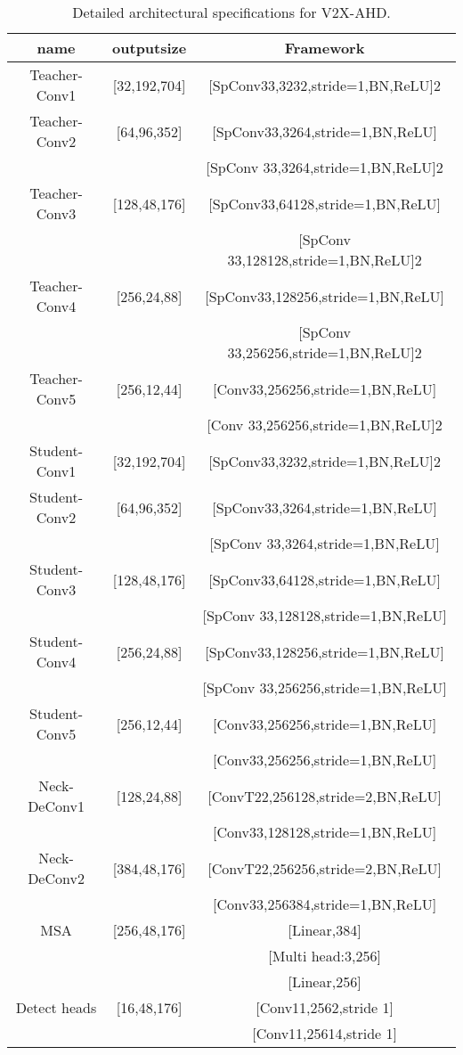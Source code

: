 \documentclass[lettersize,journal]{IEEEtran}
\begin{document}
\begin{table}
\renewcommand\arraystretch{1.8}
\tabcolsep=0.1cm
\caption{Detailed architectural specifications for V2X-AHD.}
\label{tab1}
\centering
\begin{tabular}{ c c c }
\hline
name & outputsize& Framework\\

\hline
Teacher-Conv1&[32,192,704]&[SpConv33,3232,stride=1,BN,ReLU]2\\
Teacher-Conv2&[64,96,352]&[SpConv33,3264,stride=1,BN,ReLU]\\
&&[SpConv 33,3264,stride=1,BN,ReLU]2\\
Teacher-Conv3&[128,48,176]&[SpConv33,64128,stride=1,BN,ReLU]\\
&&[SpConv 33,128128,stride=1,BN,ReLU]2\\
Teacher-Conv4&[256,24,88]&[SpConv33,128256,stride=1,BN,ReLU]\\
&&[SpConv 33,256256,stride=1,BN,ReLU]2\\
Teacher-Conv5&[256,12,44]&[Conv33,256256,stride=1,BN,ReLU]\\
&&[Conv 33,256256,stride=1,BN,ReLU]2\\
\hline
Student-Conv1&[32,192,704]&[SpConv33,3232,stride=1,BN,ReLU]2\\
Student-Conv2&[64,96,352]&[SpConv33,3264,stride=1,BN,ReLU]\\
&&[SpConv 33,3264,stride=1,BN,ReLU]\\
Student-Conv3&[128,48,176]&[SpConv33,64128,stride=1,BN,ReLU]\\
&&[SpConv 33,128128,stride=1,BN,ReLU]\\
Student-Conv4&[256,24,88]&[SpConv33,128256,stride=1,BN,ReLU]\\
&&[SpConv 33,256256,stride=1,BN,ReLU]\\
Student-Conv5&[256,12,44]&[Conv33,256256,stride=1,BN,ReLU]\\
&&[Conv33,256256,stride=1,BN,ReLU]\\
\hline
Neck-DeConv1&[128,24,88]&[ConvT22,256128,stride=2,BN,ReLU]\\
&&[Conv33,128128,stride=1,BN,ReLU]\\
Neck-DeConv2&[384,48,176]&[ConvT22,256256,stride=2,BN,ReLU]\\
&&[Conv33,256384,stride=1,BN,ReLU]\\
\hline
MSA&[256,48,176]&[Linear,384]\\
&&[Multi head:3,256]\\
&&[Linear,256]\\
\hline
Detect heads&[16,48,176]&[Conv11,2562,stride 1]\\
&&[Conv11,25614,stride 1]\\
\hline

\end{tabular}
\end{table}
\end{document}
